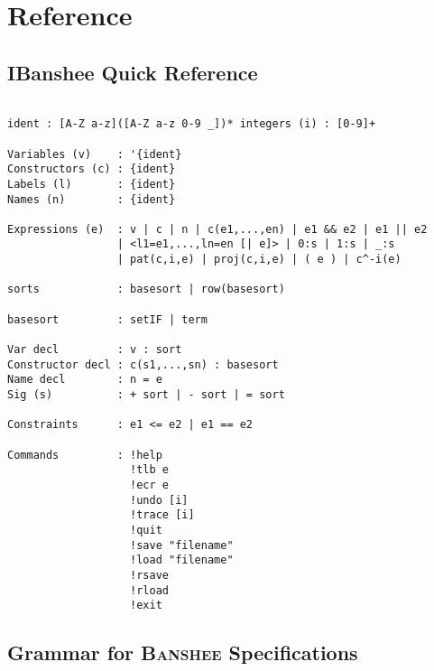 \documentclass[10pt]{article}
\newcommand{\banshee}{\textsc{Banshee}}
\begin{document}
\section{Reference}
\label{sec-reference}

\subsection{IBanshee Quick Reference}
\begin{verbatim}

ident : [A-Z a-z]([A-Z a-z 0-9 _])* integers (i) : [0-9]+

Variables (v)    : '{ident}
Constructors (c) : {ident}
Labels (l)       : {ident}
Names (n)        : {ident}

Expressions (e)  : v | c | n | c(e1,...,en) | e1 && e2 | e1 || e2
                 | <l1=e1,...,ln=en [| e]> | 0:s | 1:s | _:s
                 | pat(c,i,e) | proj(c,i,e) | ( e ) | c^-i(e)

sorts            : basesort | row(basesort)

basesort         : setIF | term

Var decl         : v : sort
Constructor decl : c(s1,...,sn) : basesort
Name decl        : n = e 
Sig (s)          : + sort | - sort | = sort

Constraints      : e1 <= e2 | e1 == e2

Commands         : !help
                   !tlb e
                   !ecr e
                   !undo [i]
                   !trace [i]
                   !quit
                   !save "filename"
                   !load "filename"
                   !rsave
                   !rload
                   !exit
\end{verbatim}

\subsection{Grammar for \banshee{} Specifications}
\end{document}
